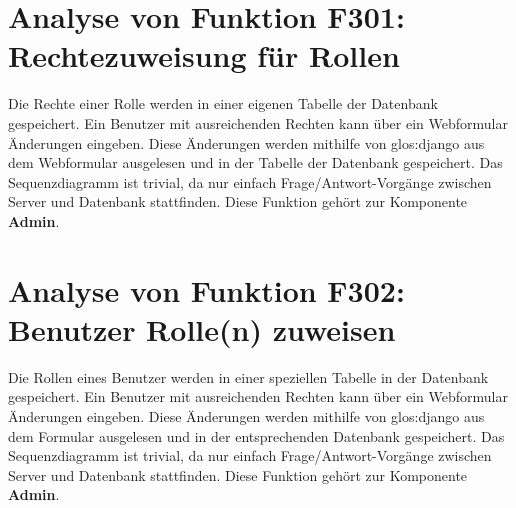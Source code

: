 \section{Analyse von Funktion F301: Rechtezuweisung für Rollen}
Die Rechte einer Rolle werden in einer eigenen Tabelle der Datenbank gespeichert. Ein Benutzer mit ausreichenden Rechten kann über ein Webformular Änderungen eingeben. Diese Änderungen werden mithilfe von \gls{glos:django} aus dem Webformular ausgelesen und in der Tabelle der Datenbank gespeichert. Das Sequenzdiagramm ist trivial, da nur einfach Frage/Antwort-Vorgänge zwischen Server und Datenbank stattfinden. Diese Funktion gehört zur Komponente \textbf{Admin}.

\section{Analyse von Funktion F302: Benutzer Rolle(n) zuweisen}
Die Rollen eines Benutzer werden in einer speziellen Tabelle in der Datenbank gespeichert. Ein Benutzer mit ausreichenden Rechten kann über ein Webformular Änderungen eingeben. Diese Änderungen werden mithilfe von \gls{glos:django} aus dem Formular ausgelesen und in der entsprechenden Datenbank gespeichert. Das Sequenzdiagramm ist trivial, da nur einfach Frage/Antwort-Vorgänge zwischen Server und Datenbank stattfinden. Diese Funktion gehört zur Komponente \textbf{Admin}.
